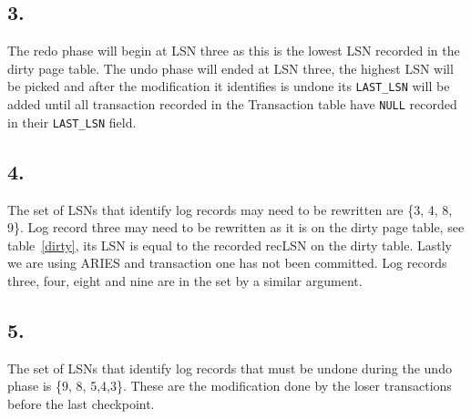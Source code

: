 \documentclass[12pt]{article}
\begin{document}
\subsection*{3.}
The redo phase will begin at LSN three as this is the lowest LSN recorded in the dirty page table. The undo phase will ended at LSN three, the highest LSN will be picked and after the modification it identifies is undone its \texttt{LAST\_LSN} will be added until all transaction recorded in the Transaction table have \texttt{NULL} recorded in their \texttt{LAST\_LSN} field.
\subsection*{4.}
The set of LSNs that identify log records may need to be rewritten are \{3, 4, 8, 9\}. Log record three may need to be rewritten as it is on the dirty page table, see table~\ref{dirty}, its LSN is equal to the recorded recLSN on the dirty table. Lastly we are using ARIES and transaction one has not been committed. Log records three, four, eight and nine are in the set by a similar argument. 
\subsection*{5.}
The set of LSNs that identify log records that must be undone during the undo phase is \{9, 8, 5,4,3\}. These are the modification done by the loser transactions before the last checkpoint.
\end{document}
